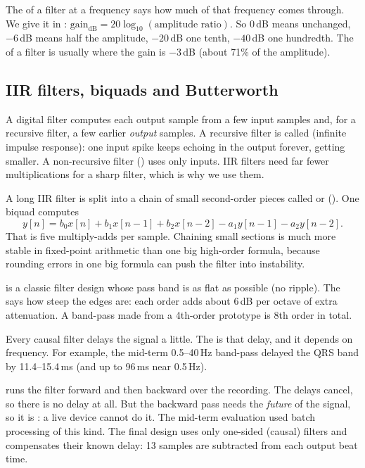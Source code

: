 \documentclass[11pt]{article}
\begin{document}
The  of a filter at a frequency says how much of that frequency comes through. We give it in : $\text{gain}_{\text{dB}} = 20\log_{10}(\text{amplitude ratio})$. So 0\,dB means unchanged, $-6$\,dB means half the amplitude, $-20$\,dB one tenth, $-40$\,dB one hundredth. The  of a filter is usually where the gain is $-3$\,dB (about 71\% of the amplitude).

\subsection{IIR filters, biquads and Butterworth}
A digital filter computes each output sample from a few input samples and, for a recursive filter, a few earlier \emph{output} samples. A recursive filter is called  (infinite impulse response): one input spike keeps echoing in the output forever, getting smaller. A non-recursive filter () uses only inputs. IIR filters need far fewer multiplications for a sharp filter, which is why we use them.

A long IIR filter is split into a chain of small second-order pieces called  or  (). One biquad computes
\[
y[n] = b_0x[n] + b_1x[n-1] + b_2x[n-2] - a_1y[n-1] - a_2y[n-2].
\]
That is five multiply-adds per sample. Chaining small sections is much more stable in fixed-point arithmetic than one big high-order formula, because rounding errors in one big formula can push the filter into instability.

 is a classic filter design whose pass band is as flat as possible (no ripple). The  says how steep the edges are: each order adds about 6\,dB per octave of extra attenuation. A band-pass made from a 4th-order prototype is 8th order in total.

\begin{simple}
Every causal filter delays the signal a little. The  is that delay, and it depends on frequency. For example, the mid-term 0.5--40\,Hz band-pass delayed the QRS band by 11.4--15.4\,ms (and up to 96\,ms near 0.5\,Hz).

 runs the filter forward and then backward over the recording. The delays cancel, so there is no delay at all. But the backward pass needs the \emph{future} of the signal, so it is : a live device cannot do it. The mid-term evaluation used batch processing of this kind. The final design uses only one-sided (causal) filters and compensates their known delay: 13 samples are subtracted from each output beat time.
\end{simple}
\end{document}
